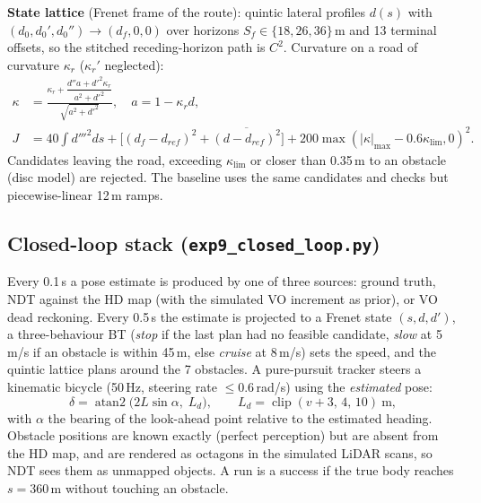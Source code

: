 \documentclass[11pt,a4paper]{article}
\begin{document}
\textbf{State lattice} (Frenet frame of the route): quintic lateral profiles $d(s)$ with $(d_0,d_0',d_0'')\to(d_f,0,0)$ over horizons $S_f\in\{18,26,36\}$\,m and 13 terminal offsets, so the stitched receding-horizon path is $C^2$. Curvature on a road of curvature $\kappa_r$ ($\kappa_r'$ neglected):
\begin{align}
\kappa&=\frac{\kappa_r+\dfrac{d''a+d'^{2}\kappa_r}{a^2+d'^2}}{\sqrt{a^2+d'^2}},\quad a=1-\kappa_r d,\\
J&=40\!\int\! d'''^{2}ds+\big[(d_f-d_{ref})^2+\overline{(d-d_{ref})^2}\big]+200\max(|\kappa|_{\max}-0.6\kappa_{\lim},0)^2 .
\end{align}
Candidates leaving the road, exceeding $\kappa_{\lim}$ or closer than 0.35\,m to an obstacle (disc model) are rejected. The baseline uses the same candidates and checks but piecewise-linear 12\,m ramps.

\subsection{Closed-loop stack (\texttt{exp9\_closed\_loop.py})}
Every 0.1\,s a pose estimate is produced by one of three sources: ground truth, NDT against the HD map (with the simulated VO increment as prior), or VO dead reckoning. Every 0.5\,s the estimate is projected to a Frenet state $(s,d,d')$, a three-behaviour BT (\emph{stop} if the last plan had no feasible candidate, \emph{slow} at 5\,m/s if an obstacle is within 45\,m, else \emph{cruise} at 8\,m/s) sets the speed, and the quintic lattice plans around the 7 obstacles. A pure-pursuit tracker steers a kinematic bicycle (50\,Hz, steering rate $\le0.6$\,rad/s) using the \emph{estimated} pose:
\begin{equation}
\delta=\operatorname{atan2}\big(2L\sin\alpha,\;L_d\big),\qquad L_d=\operatorname{clip}(v+3,\,4,\,10)\ \text{m},
\end{equation}
with $\alpha$ the bearing of the look-ahead point relative to the estimated heading. Obstacle positions are known exactly (perfect perception) but are absent from the HD map, and are rendered as octagons in the simulated LiDAR scans, so NDT sees them as unmapped objects. A run is a success if the true body reaches $s=360$\,m without touching an obstacle.
\end{document}
